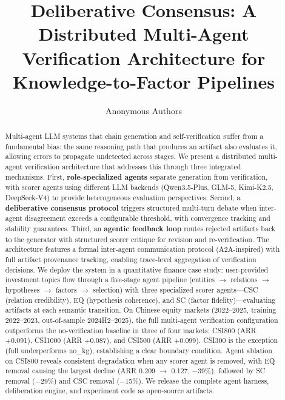 \documentclass[sigconf]{acmart}
\begin{document}
\title{Deliberative Consensus: A Distributed Multi-Agent Verification Architecture for Knowledge-to-Factor Pipelines}

\author{Anonymous Authors}

\begin{abstract}
Multi-agent LLM systems that chain generation and self-verification suffer from a fundamental bias: the same reasoning path that produces an artifact also evaluates it, allowing errors to propagate undetected across stages. We present a distributed multi-agent verification architecture that addresses this through three integrated mechanisms. First, \textbf{role-specialized agents} separate generation from verification, with scorer agents using different LLM backends (Qwen3.5-Plus, GLM-5, Kimi-K2.5, DeepSeek-V4) to provide heterogeneous evaluation perspectives. Second, a \textbf{deliberative consensus protocol} triggers structured multi-turn debate when inter-agent disagreement exceeds a configurable threshold, with convergence tracking and stability guarantees. Third, an \textbf{agentic feedback loop} routes rejected artifacts back to the generator with structured scorer critique for revision and re-verification. The architecture features a formal inter-agent communication protocol (A2A-inspired) with full artifact provenance tracking, enabling trace-level aggregation of verification decisions. We deploy the system in a quantitative finance case study: user-provided investment topics flow through a five-stage agent pipeline (entities $\rightarrow$ relations $\rightarrow$ hypotheses $\rightarrow$ factors $\rightarrow$ selection) with three specialized scorer agents---CSC (relation credibility), EQ (hypothesis coherence), and SC (factor fidelity)---evaluating artifacts at each semantic transition. On Chinese equity markets (2022--2025, training 2022--2023, out-of-sample 2024H2--2025), the full multi-agent verification configuration outperforms the no-verification baseline in three of four markets: CSI800 (ARR +0.091), CSI1000 (ARR +0.087), and CSI500 (ARR +0.099). CSI300 is the exception (full underperforms no\_kg), establishing a clear boundary condition. Agent ablation on CSI800 reveals consistent degradation when any scorer agent is removed, with EQ removal causing the largest decline (ARR 0.209 $\rightarrow$ 0.127, $-$39\%), followed by SC removal ($-$29\%) and CSC removal ($-$15\%). We release the complete agent harness, deliberation engine, and experiment code as open-source artifacts.
\end{abstract}
\end{document}
